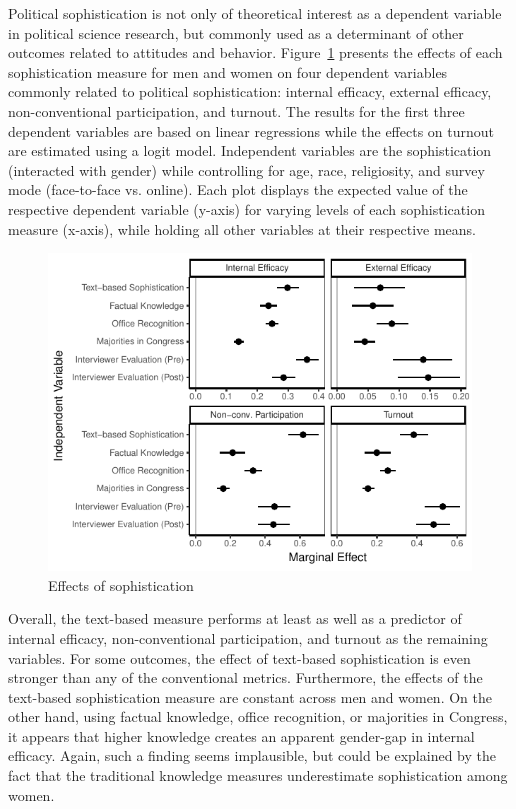 \documentclass[12pt]{article}
\begin{document}
Political sophistication is not only of theoretical interest as a dependent variable in political science research, but commonly used as a determinant of other outcomes related to attitudes and behavior. Figure~\ref{fig:knoweff} presents the effects of each sophistication measure for men and women on four dependent variables commonly related to political sophistication: internal efficacy, external efficacy, non-conventional participation, and turnout. The results for the first three dependent variables are based on linear regressions while the effects on turnout are estimated using a logit model. Independent variables are the sophistication (interacted with gender) while controlling for age, race, religiosity, and survey mode (face-to-face vs. online). Each plot displays the expected value of the respective dependent variable (y-axis) for varying levels of each sophistication measure (x-axis), while holding all other variables at their respective means.

\begin{figure}[h]\centering
\includegraphics{../fig/knoweff.pdf}
\caption{Effects of sophistication}\label{fig:knoweff}
\end{figure}

Overall, the text-based measure performs at least as well as a predictor of internal efficacy, non-conventional participation, and turnout as the remaining variables. For some outcomes, the effect of text-based sophistication is even stronger than any of the conventional metrics. Furthermore, the effects of the text-based sophistication measure are constant across men and women. On the other hand, using factual knowledge, office recognition, or majorities in Congress, it appears that higher knowledge creates an apparent gender-gap in internal efficacy. Again, such a finding seems implausible, but could be explained by the fact that the traditional knowledge measures underestimate sophistication among women.
\end{document}
